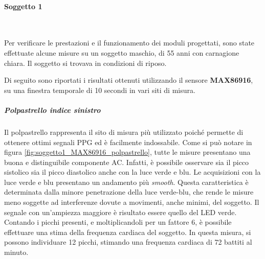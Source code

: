 \clearpage

\paragraph{Soggetto 1}~

\vspace{1cm}

\noindent Per verificare le prestazioni e il funzionamento dei moduli progettati, sono state effettuate alcune misure su un soggetto maschio, di 55 anni con carnagione chiara. Il soggetto si trovava in condizioni di riposo.

\vspace{0.5cm}

\noindent Di seguito sono riportati i risultati ottenuti utilizzando il sensore \textbf{MAX86916}, su una finestra temporale di 10 secondi in vari siti di misura.

\subparagraph{Polpastrello indice sinistro}

Il polpastrello rappresenta il sito di misura più utilizzato poiché permette di ottenere ottimi segnali PPG ed è facilmente indossabile. Come si può notare in figura \ref{fig:soggetto1_MAX86916_polpastrello}, tutte le misure presentano una buona e distinguibile componente AC. Infatti, è possibile osservare sia il picco sistolico sia il picco diastolico anche con la luce verde e blu. Le acquisizioni con la luce verde e blu presentano un andamento più \textit{smooth}. Questa caratteristica è determinata dalla minore penetrazione della luce verde-blu, che rende le misure meno soggette ad interferenze dovute a movimenti, anche minimi, del soggetto. Il segnale con un'ampiezza maggiore è risultato essere quello del LED verde. Contando i picchi presenti, e moltiplicandoli per un fattore 6, è possibile effettuare una stima della frequenza cardiaca del soggetto. In questa misura, si possono individuare 12 picchi, stimando una frequenza cardiaca di 72 battiti al minuto.

